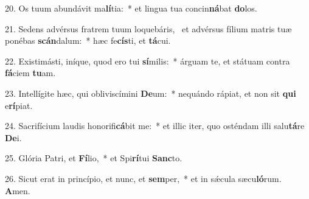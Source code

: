20. Os tuum abundávit ma\textbf{lí}tia:~*  et lingua tua concin\textbf{ná}bat \textbf{do}los.\

21. Sedens advérsus fratrem tuum loquebáris, \dag\  et advérsus fílium matris tuæ ponébas \textbf{scán}dalum:~*  hæc fe\textbf{cís}ti, et \textbf{tá}cui.\

22. Existimásti, iníque, quod ero tui \textbf{sí}milis:~*  árguam te, et státuam contra \textbf{fá}ciem \textbf{tu}am.\

23. Intellígite hæc, qui obliviscímini \textbf{De}um:~*  nequándo rápiat, et non sit \textbf{qui} e\textbf{rí}piat.\

24. Sacrifícium laudis honorifi\textbf{cá}bit me:~*  et illic iter, quo osténdam illi salu\textbf{tá}re \textbf{De}i.\

25. Glória Patri, et \textbf{Fí}lio,~*  et Spi\textbf{rí}tui \textbf{Sanc}to.\

26. Sicut erat in princípio, et nunc, et \textbf{sem}per,~*  et in sǽcula sæcu\textbf{ló}rum. \textbf{A}men.\

